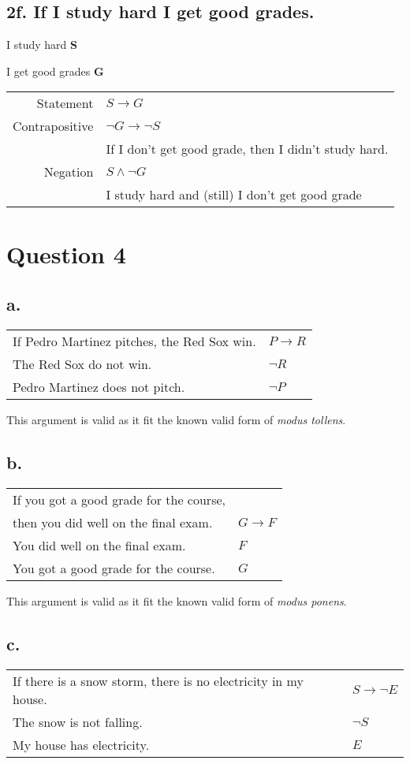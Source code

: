 \documentclass{article}
\begin{document}
\subsection*{2f. If I study hard I get good grades.}
I study hard \textbf{S}

I get good grades \textbf{G}

\begin{tabular}{r|l}
    Statement & $S \rightarrow G$ \\
    Contrapositive & $\neg G \rightarrow \neg S$ \\
    & If I don't get good grade, then I didn't study hard. \\
    Negation & $S \land \neg G$ \\
    & I study hard and (still) I don't get good grade
\end{tabular}
\section*{Question 4}
\subsection*{a.}
\begin{tabular}{l|l}
    If Pedro Martinez pitches, the Red Sox win. & $P \rightarrow R$\\
    The Red Sox do not win. & $\neg R$\\ \hline
    Pedro Martinez does not pitch. & $\neg P$
\end{tabular}

This argument is valid as it fit the known valid form of \textit{modus tollens}. 

\subsection*{b.}
\begin{tabular}{l|l}
    If you got a good grade for the course,& \\
    then you did well on the final exam. & $G \rightarrow F$\\
    You did well on the final exam. & $F$\\ \hline
    You got a good grade for the course. & $G$
\end{tabular}

This argument is valid as it fit the known valid form of \textit{modus ponens}. 

\subsection*{c.}
\begin{tabular}{l|l}
    If there is a snow storm, there is no electricity in my house. & $S \rightarrow \neg E$ \\
    The snow is not falling. & $\neg S$ \\ \hline
    My house has electricity. & $E$
\end{tabular}
\end{document}
